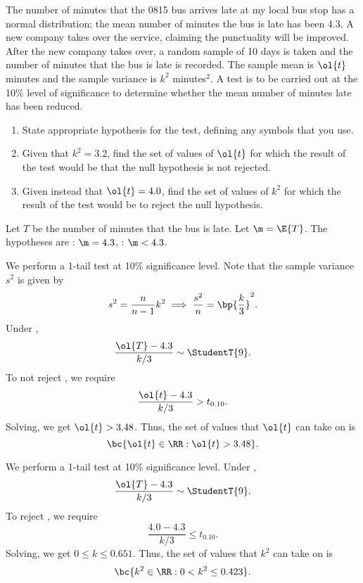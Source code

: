 \begin{problem}
    The number of minutes that the 0815 bus arrives late at my local bus stop has a normal distribution; the mean number of minutes the bus is late has been 4.3. A new company takes over the service, claiming the punctuality will be improved. After the new company takes over, a random sample of 10 days is taken and the number of minutes that the bus is late is recorded. The sample mean is $\ol{t}$ minutes and the sample variance is $k^2$ minutes$^2$. A test is to be carried out at the 10\% level of significance to determine whether the mean number of minutes late has been reduced.

    \begin{enumerate}
        \item State appropriate hypothesis for the test, defining any symbols that you use.
        \item Given that $k^2 = 3.2$, find the set of values of $\ol{t}$ for which the result of the test would be that the null hypothesis is not rejected.
        \item Given instead that $\ol{t} = 4.0$, find the set of values of $k^2$ for which the result of the test would be to reject the null hypothesis.
    \end{enumerate}
\end{problem}
\begin{solution}
    \begin{ppart}
        Let $T$ be the number of minutes that the bus is late. Let $\m = \E{T}$. The hypotheses are \nullhyp: $\m = 4.3$, \althyp: $\m < 4.3$.
    \end{ppart}
    \begin{ppart}
        We perform a 1-tail test at 10\% significance level. Note that the sample variance $s^2$ is given by \[s^2 = \frac{n}{n-1} k^2 \implies \frac{s^2}{n} = \bp{\frac{k}{3}}^2.\] Under \nullhyp, \[\frac{\ol{T} - 4.3}{k/3} \sim \StudentT{9}.\] To not reject \nullhyp, we require \[\frac{\ol{t} - 4.3}{k/3} > t_{0.10}.\] Solving, we get $\ol{t} > 3.48$. Thus, the set of values that $\ol{t}$ can take on is \[\bc{\ol{t} \in \RR: \ol{t} > 3.48}.\]
    \end{ppart}
    \begin{ppart}
        We perform a 1-tail test at 10\% significance level. Under \nullhyp, \[\frac{\ol{T} - 4.3}{k/3} \sim \StudentT{9}.\] To reject \nullhyp, we require \[\frac{4.0 - 4.3}{k/3} \leq t_{0.10}.\] Solving, we get $0 \leq k \leq 0.651$. Thus, the set of values that $k^2$ can take on is \[\bc{k^2 \in \RR : 0 < k^2 \leq 0.423}.\]
    \end{ppart}
\end{solution}